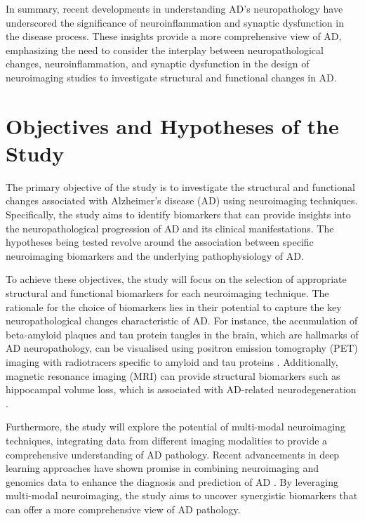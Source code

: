 \documentclass[10pt]{article}
\begin{document}
\begin{sloppypar}
  In summary, recent developments in understanding AD's neuropathology have underscored the significance of neuroinflammation and synaptic dysfunction in the disease process. These insights provide a more comprehensive view of AD, emphasizing the need to consider the interplay between neuropathological changes, neuroinflammation, and synaptic dysfunction in the design of neuroimaging studies to investigate structural and functional changes in AD.

  \section{Objectives and Hypotheses of the Study}
  \label{sec:objectives-and-hypotheses}

  The primary objective of the study is to investigate the structural and functional changes associated with Alzheimer's disease (AD) using neuroimaging techniques. Specifically, the study aims to identify biomarkers that can provide insights into the neuropathological progression of AD and its clinical manifestations. The hypotheses being tested revolve around the association between specific neuroimaging biomarkers and the underlying pathophysiology of AD.

  To achieve these objectives, the study will focus on the selection of appropriate structural and functional biomarkers for each neuroimaging technique. The rationale for the choice of biomarkers lies in their potential to capture the key neuropathological changes characteristic of AD. For instance, the accumulation of beta-amyloid plaques and tau protein tangles in the brain, which are hallmarks of AD neuropathology, can be visualised using positron emission tomography (PET) imaging with radiotracers specific to amyloid and tau proteins \citep{bao_pet_2021}. Additionally, magnetic resonance imaging (MRI) can provide structural biomarkers such as hippocampal volume loss, which is associated with AD-related neurodegeneration \citep{besson_cognitive_2015}.

  Furthermore, the study will explore the potential of multi-modal neuroimaging techniques, integrating data from different imaging modalities to provide a comprehensive understanding of AD pathology. Recent advancements in deep learning approaches have shown promise in combining neuroimaging and genomics data to enhance the diagnosis and prediction of AD \citep{lin_deep_2021}. By leveraging multi-modal neuroimaging, the study aims to uncover synergistic biomarkers that can offer a more comprehensive view of AD pathology.


\end{sloppypar}
\end{document}
